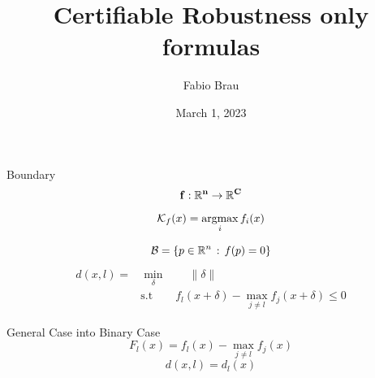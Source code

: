 \documentclass[aspectratio=169, 9pt]{beamer}
\title{Certifiable Robustness only formulas}
\date{March 1, 2023}
\author{Fabio Brau}
\institute{Scuola Superiore Sant'Anna, Pisa.}
\theoremstyle{definition}
\DeclareMathOperator*{\argmax}{argmax}
\begin{document}
{%
\maketitle
}
\begin{frame}{Boundary}
  \[
    \mathbf{f:\mathbb{R}^n\to\mathbb{R}^C}
  \]
  \[
    \KK_f(x) = \argmax_i f_i(x)
  \]

  \[
    \mathcal{B}=\left\{ p\in\mathbb{R}^n\,:\, f(p) = 0 \right\}
  \]
  \[
    \begin{aligned}
      d(x,l)=&\min_\delta\quad\quad \|\delta\|\\
      &\mbox{s.t}\quad \quad f_l(x+\delta) - \max_{j\ne l} f_j(x+\delta)\le 0
    \end{aligned}
  \]
\end{frame}
\begin{frame}{General Case into Binary Case}
  \[
    F_l(x) = f_l(x) - \max_{j\ne l} f_j(x)
  \]
  \[
    d(x,l) = d_l(x)
  \]
\end{frame}
\end{document}
